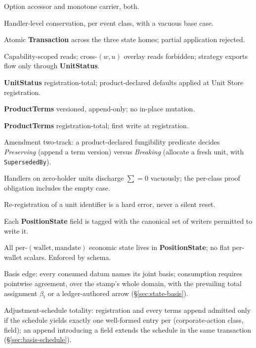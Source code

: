\begin{description}[style=nextline]
\item[C1] Option accessor and monotone carrier, both.
\item[C2] Handler-level conservation, per event class, with a vacuous base case.
\item[C3] Atomic \textbf{Transaction} across the three state homes; partial application rejected.
\item[C4] Capability-scoped reads; cross-$(w,u)$ overlay reads forbidden; strategy exports flow only through \textbf{UnitStatus}.
\item[C5] \textbf{UnitStatus} registration-total; product-declared defaults applied at Unit Store registration.
\item[C6] \textbf{ProductTerms} versioned, append-only; no in-place mutation.
\item[C7] \textbf{ProductTerms} registration-total; first write at registration.
\item[C8] Amendment two-track: a product-declared fungibility predicate decides \emph{Preserving} (append a term version) versus \emph{Breaking} (allocate a fresh unit, with \texttt{SupersededBy}).
\item[C9] Handlers on zero-holder units discharge $\sum=0$ vacuously; the per-class proof obligation includes the empty case.
\item[C10] Re-registration of a unit identifier is a hard error, never a silent reset.
\item[C11] Each \textbf{PositionState} field is tagged with the canonical set of writers permitted to write it.
\item[C12] All per-$(\text{wallet},\text{mandate})$ economic state lives in \textbf{PositionState}; no flat per-wallet scalars. Enforced by schema.
\item[C13] Basis edge: every consumed datum names its joint basis; consumption requires pointwise agreement, over the stamp's whole domain, with the prevailing total assignment $\beta_t$ or a ledger-authored arrow (\S\ref{sec:state-basis}).
\item[C14] Adjustment-schedule totality: registration and every terms append admitted only if the schedule yields exactly one well-formed entry per (corporate-action class, field); an append introducing a field extends the schedule in the same transaction (\S\ref{sec:basis-schedule}).
\end{description}

